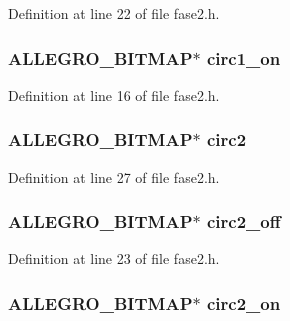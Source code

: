 Definition at line 22 of file fase2.\-h.

\hypertarget{struct_level_dois_a15699608afb18fad793848cd8fd32fe0}{
\subsubsection[{circ1\-\_\-on}]{\setlength{\rightskip}{0pt plus 5cm}A\-L\-L\-E\-G\-R\-O\-\_\-\-B\-I\-T\-M\-A\-P$\ast$ circ1\-\_\-on}}\label{struct_level_dois_a15699608afb18fad793848cd8fd32fe0}


Definition at line 16 of file fase2.\-h.

\hypertarget{struct_level_dois_a1b8836cb8a00a286c87bfbafdacbd03d}{
\subsubsection[{circ2}]{\setlength{\rightskip}{0pt plus 5cm}A\-L\-L\-E\-G\-R\-O\-\_\-\-B\-I\-T\-M\-A\-P$\ast$ circ2}}\label{struct_level_dois_a1b8836cb8a00a286c87bfbafdacbd03d}


Definition at line 27 of file fase2.\-h.

\hypertarget{struct_level_dois_a384448f3d672f70b70b1bf454cb46e50}{
\subsubsection[{circ2\-\_\-off}]{\setlength{\rightskip}{0pt plus 5cm}A\-L\-L\-E\-G\-R\-O\-\_\-\-B\-I\-T\-M\-A\-P$\ast$ circ2\-\_\-off}}\label{struct_level_dois_a384448f3d672f70b70b1bf454cb46e50}


Definition at line 23 of file fase2.\-h.

\hypertarget{struct_level_dois_aa582b8f9acdbb85a2d1d54705e26fa15}{
\subsubsection[{circ2\-\_\-on}]{\setlength{\rightskip}{0pt plus 5cm}A\-L\-L\-E\-G\-R\-O\-\_\-\-B\-I\-T\-M\-A\-P$\ast$ circ2\-\_\-on}}\label{struct_level_dois_aa582b8f9acdbb85a2d1d54705e26fa15}


